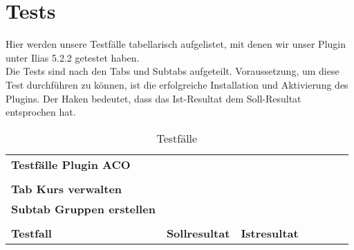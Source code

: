 \chapter{Tests}
\minitoc

Hier werden unsere Testfälle tabellarisch aufgelistet, mit denen wir unser Plugin unter Ilias 5.2.2 getestet haben. \\
Die Tests sind nach den Tabs und Subtabs aufgeteilt. Voraussetzung, um diese Test durchführen zu können, ist die erfolgreiche Installation und Aktivierung des Plugins.  
Der Haken bedeutet, dass das Ist-Resultat dem Soll-Resultat entsprochen hat. \\

\begin{table}[]
	\centering
	\caption{Testfälle}
	\label{table1}
	\begin{tabular}{p{6cm}p{7cm}p{3cm}llll}
	\textbf{\large{Testfälle Plugin ACO } }                                                                                                              &                                                                                                          &             &  &  &  \\
		&                                                                                                                                                                  &             &  &  &  \\
		\textbf{Tab Kurs verwalten}                                                                                                                   &                                                                                                                                                                  &             &  &  &  \\
		\textbf{Subtab Gruppen erstellen }                                                                                                            &                                                                                                                                                                  &             &  &  &  \\
		&                                                                                                                                                                  &             &  &  &  \\
		\textbf{Testfall  }                                                                                                                           & \textbf{Sollresultat  }                                                                                                                                                   &\textbf{ Istresultat} &  &  &  \\

\end{tabular}
\end{table}
